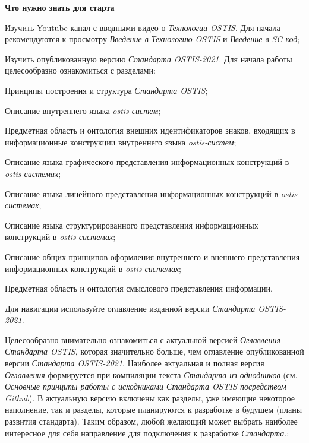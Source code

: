 
\begin{SCn}

\scnsectionheader{\currentname}
\begin{scnitemize}
	\item \textbf{Что нужно знать для старта}
	\begin{scnitemizeii}
		\item Изучить Youtube-канал с вводными видео о \textit{Технологии OSTIS}. Для начала рекомендуются к просмотру \textit{Введение в Технологию OSTIS} и \textit{Введение в SC-код};
		\item Изучить опубликованную версию \textit{Стандарта OSTIS-2021}. Для начала работы целесообразно ознакомиться с разделами:
		\begin{scnitemizeiii}
			\item Принципы построения и структура \textit{Стандарта OSTIS};
			\item Описание внутреннего языка \textit{ostis-систем};
			\item Предметная область и онтология внешних идентификаторов знаков, входящих в информационные конструкции внутреннего языка \textit{ostis-систем};
			\item Описание языка графического представления информационных конструкций в \textit{ostis-системах};
			\item Описание языка линейного представления информационных конструкций в \textit{ostis-системах};
			\item Описание языка структурированного представления информационных конструкций в \textit{ostis-системах};
			\item Описание общих принципов оформления внутреннего и внешнего представления информационных конструкций в \textit{ostis-системах};
			\item Предметная область и онтология смыслового представления информации.	
		\end{scnitemizeiii}
		Для навигации используйте оглавление изданной версии \textit{Стандарта OSTIS-2021}.
		\item Целесообразно внимательно ознакомиться с актуальной версией \textit{Оглавления Стандарта OSTIS}, которая значительно больше, чем оглавление опубликованной версии \textit{Стандарта OSTIS-2021}. Наиболее актуальная и полная версия \textit{Оглавления} формируется при компиляции текста \textit{Стандарта из однодников} (см. \textit{Основные принципы работы с исходниками Стандарта OSTIS посредством Github}). В актуальную версию включены как разделы, уже имеющие некоторое наполнение, так и разделы, которые планируются к разработке в будущем (планы развития стандарта). Таким образом, любой желающий может выбрать наиболее интересное для себя направление для подключения к разработке \textit{Стандарта}.;

\end{scnitemizeii}
\end{scnitemize}
\end{SCn}
